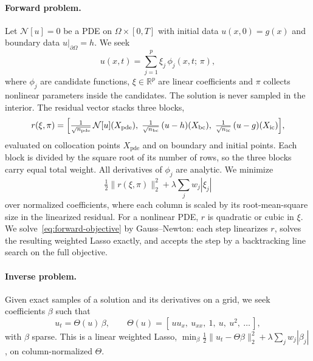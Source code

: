 \documentclass{article}
\newcommand{\R}{\mathbb{R}}
\begin{document}
\paragraph{Forward problem.}
Let $\mathcal{N}[u] = 0$ be a PDE on $\Omega\times[0,T]$ with initial data $u(x,0)=g(x)$ and boundary data $u|_{\partial\Omega} = h$. We seek
\begin{equation}
u(x,t) = \sum_{j=1}^{p} \xi_j\, \phi_j(x,t;\, \pi),
\label{eq:ansatz}
\end{equation}
where $\phi_j$ are candidate functions, $\xi\in\R^p$ are linear coefficients and $\pi$ collects nonlinear parameters inside the candidates. The solution is never sampled in the interior. The residual vector stacks three blocks,
\begin{equation}
r(\xi,\pi) = \Bigl[\tfrac{1}{\sqrt{n_{\mathrm{pde}}}}\,\mathcal{N}[u](X_{\mathrm{pde}}),\;
\tfrac{1}{\sqrt{n_{\mathrm{bc}}}}\,(u - h)(X_{\mathrm{bc}}),\;
\tfrac{1}{\sqrt{n_{\mathrm{ic}}}}\,(u - g)(X_{\mathrm{ic}})\Bigr],
\label{eq:residual}
\end{equation}
evaluated on collocation points $X_{\mathrm{pde}}$ and on boundary and initial points. Each block is divided by the square root of its number of rows, so the three blocks carry equal total weight. All derivatives of $\phi_j$ are analytic. We minimize
\begin{equation}
\tfrac12 \|r(\xi,\pi)\|_2^2 + \lambda \sum_j w_j |\xi_j|
\label{eq:forward-objective}
\end{equation}
over normalized coefficients, where each column is scaled by its root-mean-square size in the linearized residual. For a nonlinear PDE, $r$ is quadratic or cubic in $\xi$. We solve~\eqref{eq:forward-objective} by Gauss--Newton: each step linearizes $r$, solves the resulting weighted Lasso exactly, and accepts the step by a backtracking line search on the full objective.

\paragraph{Inverse problem.}
Given exact samples of a solution and its derivatives on a grid, we seek coefficients $\beta$ such that
\begin{equation}
u_t = \Theta(u)\,\beta, \qquad \Theta(u) = [\,u u_x,\ u_{xx},\ 1,\ u,\ u^2,\ \dots\,],
\label{eq:inverse}
\end{equation}
with $\beta$ sparse. This is a linear weighted Lasso, $\min_\beta \tfrac12\|u_t - \Theta\beta\|_2^2 + \lambda\sum_j w_j|\beta_j|$, on column-normalized $\Theta$.
\end{document}
